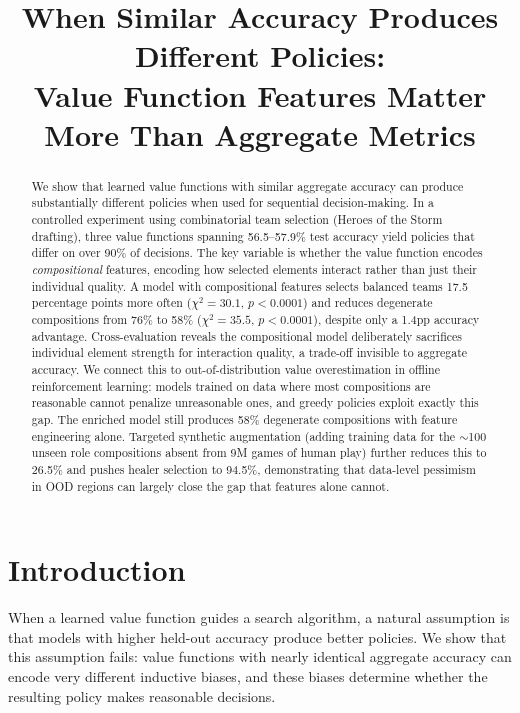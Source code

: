 \documentclass[conference]{IEEEtran}
\begin{document}
\title{When Similar Accuracy Produces Different Policies:\\ Value Function Features Matter More Than Aggregate Metrics}
\author{
}
\maketitle

\begin{abstract}
We show that learned value functions with similar aggregate accuracy can produce substantially different policies when used for sequential decision-making. In a controlled experiment using combinatorial team selection (Heroes of the Storm drafting), three value functions spanning 56.5--57.9\% test accuracy yield policies that differ on over 90\% of decisions. The key variable is whether the value function encodes \textit{compositional} features, encoding how selected elements interact rather than just their individual quality. A model with compositional features selects balanced teams 17.5 percentage points more often ($\chi^2\!=\!30.1$, $p\!<\!0.0001$) and reduces degenerate compositions from 76\% to 58\% ($\chi^2\!=\!35.5$, $p\!<\!0.0001$), despite only a 1.4pp accuracy advantage. Cross-evaluation reveals the compositional model deliberately sacrifices individual element strength for interaction quality, a trade-off invisible to aggregate accuracy. We connect this to out-of-distribution value overestimation in offline reinforcement learning: models trained on data where most compositions are reasonable cannot penalize unreasonable ones, and greedy policies exploit exactly this gap. The enriched model still produces 58\% degenerate compositions with feature engineering alone. Targeted synthetic augmentation (adding training data for the $\sim$100 unseen role compositions absent from 9M games of human play) further reduces this to 26.5\% and pushes healer selection to 94.5\%, demonstrating that data-level pessimism in OOD regions can largely close the gap that features alone cannot.
\end{abstract}

\section{Introduction}

When a learned value function guides a search algorithm, a natural assumption is that models with higher held-out accuracy produce better policies. We show that this assumption fails: value functions with nearly identical aggregate accuracy can encode very different inductive biases, and these biases determine whether the resulting policy makes reasonable decisions.
\end{document}
